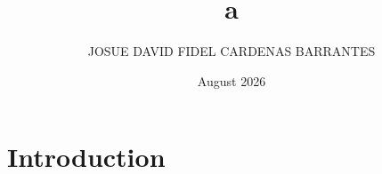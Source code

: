 \documentclass{article}
\title{a}
\author{JOSUE DAVID FIDEL CARDENAS BARRANTES}
\date{August 2026}
\begin{document}
\maketitle

\section{Introduction}
\end{document}
